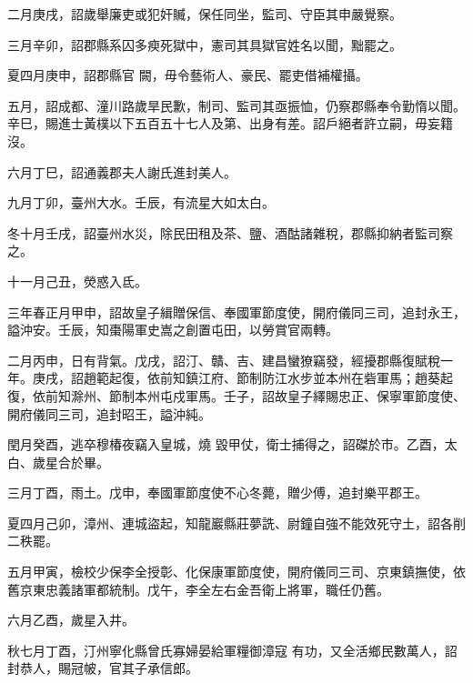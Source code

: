 \begin{pinyinscope}
 二月庚戌，詔歲舉廉吏或犯奸贓，保任同坐，監司、守臣其申嚴覺察。



 三月辛卯，詔郡縣系囚多瘐死獄中，憲司其具獄官姓名以聞，黜罷之。



 夏四月庚申，詔郡縣官
 闕，毋令藝術人、豪民、罷吏借補權攝。



 五月，詔成都、潼川路歲旱民歉，制司、監司其亟振恤，仍察郡縣奉令勤惰以聞。辛巳，賜進士黃樸以下五百五十七人及第、出身有差。詔戶絕者許立嗣，毋妄籍沒。



 六月丁巳，詔通義郡夫人謝氏進封美人。



 九月丁卯，臺州大水。壬辰，有流星大如太白。



 冬十月壬戌，詔臺州水災，除民田租及茶、鹽、酒酤諸雜稅，郡縣抑納者監司察之。



 十一月己丑，熒惑入氐。



 三年春正月甲申，詔故皇子緝贈保信、奉國軍節度使，開府儀同三司，追封永王，謚沖安。壬辰，知棗陽軍史嵩之創置屯田，以勞賞官兩轉。



 二月丙申，日有背氣。戊戌，詔汀、贛、吉、建昌蠻獠竊發，經擾郡縣復賦稅一年。庚戌，詔趙範起復，依前知鎮江府、節制防江水步並本州在砦軍馬；趙葵起復，依前知滁州、節制本州屯戍軍馬。壬子，詔故皇子繹賜忠正、保寧軍節度使、開府儀同三司，追封昭王，謚沖純。



 閏月癸酉，逃卒穆椿夜竊入皇城，燒
 毀甲仗，衛士捕得之，詔磔於市。乙酉，太白、歲星合於畢。



 三月丁酉，雨土。戊申，奉國軍節度使不心冬薨，贈少傅，追封樂平郡王。



 夏四月己卯，漳州、連城盜起，知龍巖縣莊夢詵、尉鐘自強不能效死守土，詔各削二秩罷。



 五月甲寅，檢校少保李全授彰、化保康軍節度使，開府儀同三司、京東鎮撫使，依舊京東忠義諸軍都統制。戊午，李全左右金吾衛上將軍，職任仍舊。



 六月乙酉，歲星入井。



 秋七月丁酉，汀州寧化縣曾氏寡婦晏給軍糧御漳寇
 有功，又全活鄉民數萬人，詔封恭人，賜冠帔，官其子承信郎。




\end{pinyinscope}
